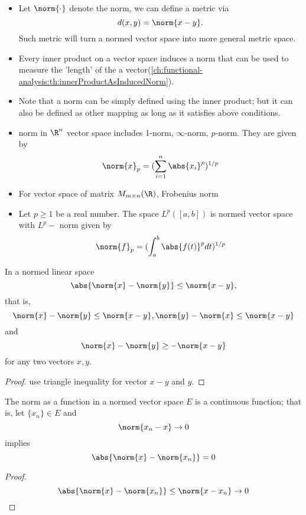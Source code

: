 \begin{refsection}
\begin{note}\hfill
\begin{itemize}
	\item Let $\norm{\cdot}$ denote the norm, we can define a metric via
	$$d(x,y) = \norm{x-y}.$$
	Such metric will turn a normed vector space into more general metric space.
    \item Every inner product on a vector space induces a norm that can be used to measure the 'length' of the a vector(\autoref{ch:functional-analysis:th:innerProductAsInducedNorm}). 
    \item Note that a norm can be simply defined using the inner product; but it can also be defined as other mapping as long as it satisfies above conditions.    
\end{itemize}
\end{note}

\begin{example}\hfill
\begin{itemize}
    \item norm in $\R^n$ vector space includes 1-norm, $\infty$-norm, $p$-norm. They are given by 
    $$\norm{x}_p = (\sum_{i=1}^n \abs{x_i}^p)^{1/p}$$
    \item For vector space of matrix $M_{m\times n}(\R)$, Frobenius norm
    \item Let $p \geq 1$ be a real number. The space $L^p([a,b])$ is normed vector space with $L^p-$ norm given by
    $$\norm{f}_p = (\int_a^b \abs{f(t)}^p dt)^{1/p}$$
\end{itemize} 
\end{example}


\begin{lemma}
In a normed linear space $$\abs{\norm{x}-\norm{y}}\leq \norm{x-y},$$that is, 
$$\norm{x}-\norm{y}\leq \norm{x-y},\norm{y}-\norm{x}\leq \norm{x-y}$$
and
$$\norm{x}-\norm{y}\geq -\norm{x-y}$$
for any two vectors $x,y$.


\end{lemma}
\begin{proof}
use triangle inequality for vector $x-y$ and $y$.
\end{proof}

\begin{theorem}
The norm as a function in a normed vector space $E$ is a continuous function; that is, let $\{x_n\}\in E$ and 
$$\norm{x_n-x}\to 0 $$
implies
$$\abs{\norm{x}-\norm{x_n}} = 0$$
\end{theorem}
\begin{proof}
$$\abs{\norm{x}-\norm{x_n}} \leq \norm{x-x_n} \to 0$$
\end{proof}


\end{refsection}
